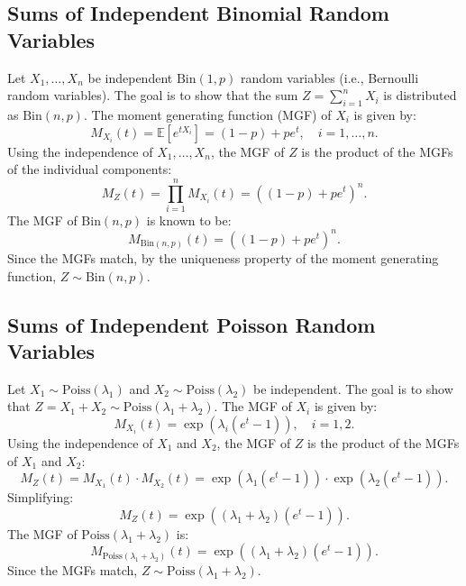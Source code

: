     \subsection{Sums of Independent Binomial Random Variables}
    
    Let \( X_1, \dots, X_n \) be independent \( \text{Bin}(1, p) \) random variables (i.e., Bernoulli random variables). The goal is to show that the sum \( Z = \sum_{i=1}^n X_i \) is distributed as \( \text{Bin}(n, p) \).
    The moment generating function (MGF) of \( X_i \) is given by:
    \[
    M_{X_i}(t) = \mathbb{E}\left[e^{t X_i}\right] = (1-p) + p e^t, \quad i = 1, \dots, n.
    \]
    Using the independence of \( X_1, \dots, X_n \), the MGF of \( Z \) is the product of the MGFs of the individual components:
    \[
    M_Z(t) = \prod_{i=1}^n M_{X_i}(t) = \left((1-p) + p e^t\right)^n.
    \]
    The MGF of \( \text{Bin}(n, p) \) is known to be:
    \[
    M_{\text{Bin}(n, p)}(t) = \left((1-p) + p e^t\right)^n.
    \] 
    Since the MGFs match, by the uniqueness property of the moment generating function, \( Z \sim \text{Bin}(n, p) \).
    
    \subsection{Sums of Independent Poisson Random Variables}
    
    Let \( X_1 \sim \text{Poiss}(\lambda_1) \) and \( X_2 \sim \text{Poiss}(\lambda_2) \) be independent. The goal is to show that \( Z = X_1 + X_2 \sim \text{Poiss}(\lambda_1 + \lambda_2) \).
    The MGF of \( X_i \) is given by:
    \[
    M_{X_i}(t) = \exp\left(\lambda_i \left(e^t - 1\right)\right), \quad i = 1, 2.
    \]
    Using the independence of \( X_1 \) and \( X_2 \), the MGF of \( Z \) is the product of the MGFs of \( X_1 \) and \( X_2 \):
    \[
    M_Z(t) = M_{X_1}(t) \cdot M_{X_2}(t) = \exp\left(\lambda_1 \left(e^t - 1\right)\right) \cdot \exp\left(\lambda_2 \left(e^t - 1\right)\right).
    \]
    Simplifying:
    \[
    M_Z(t) = \exp\left((\lambda_1 + \lambda_2) \left(e^t - 1\right)\right).
    \]
    The MGF of \( \text{Poiss}(\lambda_1 + \lambda_2) \) is:
    \[
    M_{\text{Poiss}(\lambda_1 + \lambda_2)}(t) = \exp\left((\lambda_1 + \lambda_2) \left(e^t - 1\right)\right).
    \]
    Since the MGFs match, \( Z \sim \text{Poiss}(\lambda_1 + \lambda_2) \).
    
